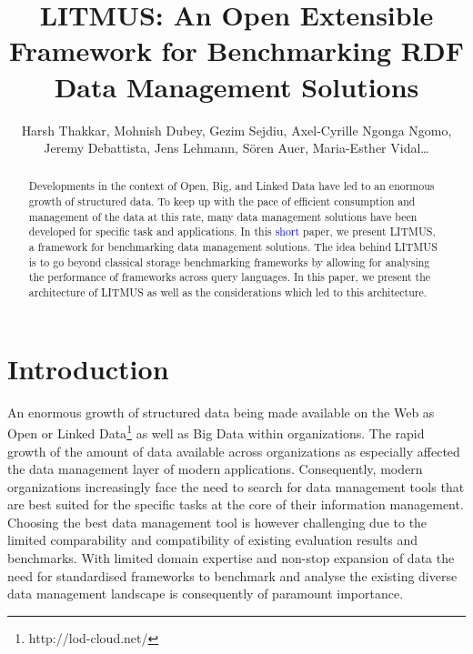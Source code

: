 \documentclass{llncs}
\begin{document}
\title{LITMUS: An Open Extensible Framework for Benchmarking RDF Data Management Solutions}


\author{Harsh Thakkar, Mohnish Dubey, Gezim Sejdiu, Axel-Cyrille Ngonga Ngomo, Jeremy Debattista, Jens Lehmann, S\"{o}ren Auer, Maria-Esther Vidal\dots}
\maketitle

\begin{abstract}
Developments in the context of Open, Big, and Linked Data have led to an enormous growth of structured data. 
To keep up with the pace of efficient consumption and management of the data at this rate, many data management solutions have been developed for specific task and applications.
In this \textcolor{blue}{short} paper, we present LITMUS, a framework for benchmarking data management solutions. The idea behind LITMUS is to go beyond classical storage benchmarking frameworks by allowing for analysing the performance of frameworks across query languages. In this paper, we present the architecture of LITMUS as well as the considerations which led to this architecture.
\end{abstract}

\section{Introduction}\label{sec:Introduction}
     
An enormous growth of structured data being made available on the Web as Open or Linked Data\footnote{http://lod-cloud.net/} as well as Big Data within organizations. 
The rapid growth of the amount of data available across organizations as especially affected the data management layer of modern applications. Consequently,
modern organizations increasingly face the need to search for data management tools that are best suited for the specific tasks at the core of their information management. 
Choosing the best data management tool is however challenging due to the limited comparability and compatibility of existing evaluation results and benchmarks. 
With limited domain expertise and non-stop expansion of data the need for standardised frameworks to benchmark and analyse the existing diverse data management landscape is consequently of paramount importance.
\end{document}
